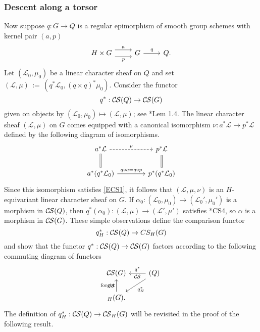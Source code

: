 \documentclass[10pt]{amsart}
\theoremstyle{plain}
\theoremstyle{definition}
\newcommand{\ceq}{{\, :=\, }}
\newcommand{\cs}[1]{{\mathcal{#1}}}
\newcommand{\CS}{{\mathcal{C\hskip-0.8pt S}}}
\begin{document}
\subsubsection{Descent along a torsor}\label{ssec:descent}

Now suppose $q : G \to Q$ is a regular epimorphism of smooth group schemes with kernel pair $(a,p)$
\[
\begin{tikzcd}
H\times G
 \arrow[shift left=2]{r}{a}
  \arrow[shift right=2,swap]{r}{p}
&
G 
\arrow{r}{q}
& 
Q.
\end{tikzcd}
\]
Let $(\cs{L}_0, \mu_0)$ be a linear character sheaf on $Q$ and set $(\cs{L}, \mu) \ceq (q^*\cs{L}_0, (q\times q)^* \mu_0)$.
Consider the functor
\[
q^* : \CS(Q) \to \CS(G)
\]
given on objects by $(\cs{L}_0,\mu_0) \mapsto (\cs{L}, \mu)$; see \cite{cunningham-roe:13a}*{Lem 1.4}.
The linear character sheaf $(\cs{L},\mu)$ on $G$ comes equipped with a canonical isomorphism $\nu : a^* \cs{L} \to p^* \cs{L}$ defined by the following diagram of isomorphisms.
\[
\begin{tikzcd}[column sep=40]
a^*\cs{L} \arrow[equal]{d} \arrow[dashed]{r}{\nu} &  \arrow[equal]{d} p^*\cs{L} \\
a^* ( q^*\cs{L}_0) \arrow{r}{q\circ a = q\circ p}
& p^* (q^*\cs{L}_0)
\end{tikzcd}
\]
Since this isomorphism satisfies \eqref{ECS1}, it follows that $(\cs{L}, \mu,\nu)$ is an $H$-equivariant linear character sheaf on $G$.
If $\alpha_0 : (\cs{L}_0,\mu_0) \to (\cs{L}_0',\mu_0')$ is a morphism in $\CS(Q)$, 
then $q^*(\alpha_0) : (\cs{L},\mu) \to (\cs{L}',\mu')$ satisfies \cite{cunningham-roe:13a}*{CS4}, so $\alpha$ is a morphism in $\CS(G)$.
These simple observations define the comparison functor
\[
q_H^* : \CS(Q) \to CS_H(G)
\]
and show that the functor $q^* : \CS(Q) \to \CS(G)$ factors according to the following commuting diagram of functors
\begin{equation}\label{qH}
\begin{tikzcd}
\CS(G) &\arrow{l}[swap]{q^*} 
\CS(Q) \arrow{dl}{q_H^*}\\
\arrow{u}{\text{forget}} \CS_{H}(G). & 
\end{tikzcd}
\end{equation}
The definition of $q_H^* : \CS(Q)\to \CS_H(G)$ will be revisited in the proof of the following result.
\end{document}
